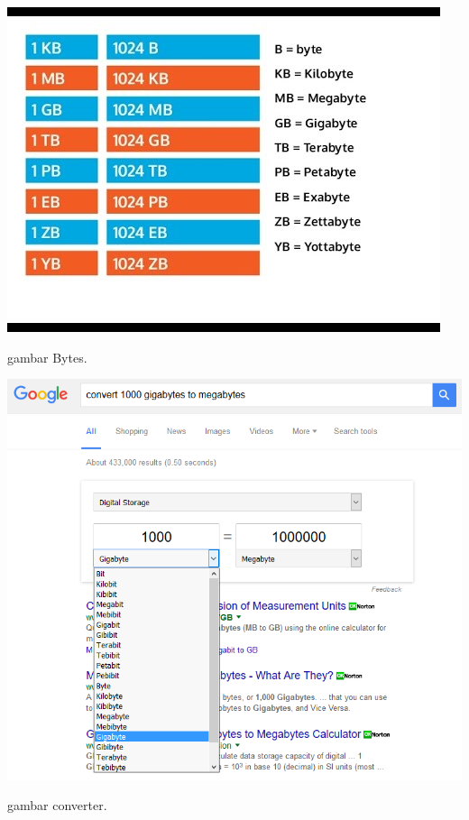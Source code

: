 \begin{figures}[ht]
\centerline{\includegraphics[width=1\texwidth]{figures/Bytes.JPG}}
\caption{gambar Bytes.}
\label{Bytes.JPG}
\end{figures}

\begin{figures}[ht]
\centerline{\includegraphics[width=1\texwidth]{figures/converter.PNG}}
\caption{gambar converter.}
\label{converter.png}
\end{figures}

